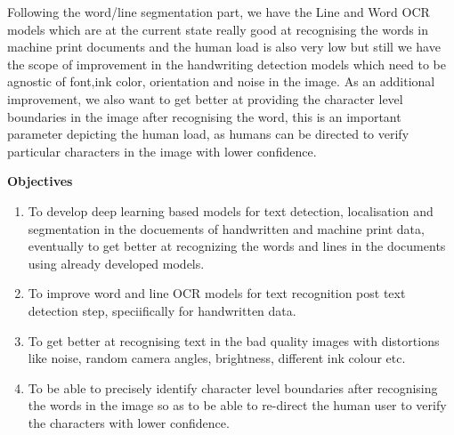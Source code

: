 Following the word/line segmentation part, we have the Line and Word OCR models which are at the current state really good at recognising the words in machine print documents and the human load is also very low but still we have the scope of improvement in the handwriting detection models which need to be agnostic of font,ink color, orientation and noise in the image. As an additional improvement, we also want to get better at providing the character level boundaries in the image after recognising the word, this is an important parameter depicting the human load, as humans can be directed to verify particular characters in the image with lower confidence.


\vspace{10pt}
\vspace{10pt}
{\Large{\textbf{Objectives}}}
\begin{enumerate}
	
	\item To develop deep learning based models for text detection, localisation and segmentation in the docuements of handwritten and  machine print data, eventually to get better at recognizing the words and lines in the documents using already developed models.
	
	\item To improve word and line OCR models for text recognition post text detection step, speciifically for handwritten data.
	
	\item To get better at recognising text in the bad quality images with distortions like noise, random camera angles, brightness, different ink colour etc.
	
	\item To be able to precisely identify character level boundaries after recognising the words in the image so as to be able to re-direct the human user to verify the characters with lower confidence.
	
\end{enumerate}
